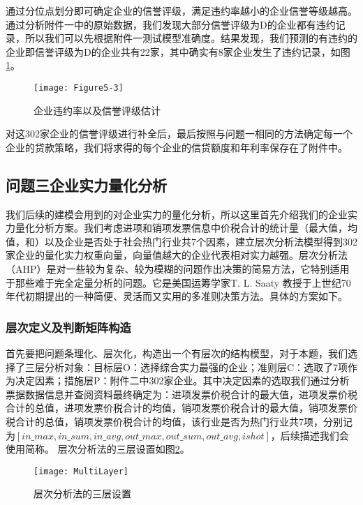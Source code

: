 \documentclass{cumcmthesis}
\begin{document}
通过分位点划分即可确定企业的信誉评级，满足违约率越小的企业信誉等级越高。通过分析附件一中的原始数据，我们发现大部分信誉评级为D的企业都有违约记录，所以我们可以先根据附件一测试模型准确度。结果发现，我们预测的有违约的企业即信誉评级为D的企业共有22家，其中确实有8家企业发生了违约记录，如图\ref{figpingji}。

\begin{figure}[H]
    \centering
    \texttt{[image: Figure5-3]}
    \caption{企业违约率以及信誉评级估计}
    \label{figpingji}
\end{figure}

对这302家企业的信誉评级进行补全后，最后按照与问题一相同的方法确定每一个企业的贷款策略，我们将求得的每个企业的信贷额度和年利率保存在了附件中。

\subsection{问题三企业实力量化分析}
我们后续的建模会用到的对企业实力的量化分析，所以这里首先介绍我们的企业实力量化分析方案。我们考虑进项和销项发票信息中价税合计的统计量（最大值，均值，和）以及企业是否处于社会热门行业共7个因素，建立层次分析法模型得到302家企业的量化实力权重向量，向量值越大的企业代表相对实力越强。层次分析法（AHP）是对一些较为复杂、较为模糊的问题作出决策的简易方法，它特别适用于那些难于完全定量分析的问题。它是美国运筹学家T. L. Saaty 教授于上世纪70 年代初期提出的一种简便、灵活而又实用的多准则决策方法。具体的方案如下。



\subsubsection{层次定义及判断矩阵构造}
首先要把问题条理化、层次化，构造出一个有层次的结构模型，对于本题，我们选择了三层分析对象：目标层O：选择综合实力最强的企业；准则层C：选取了7项作为决定因素；措施层P：附件二中302家企业。其中决定因素的选取我们通过分析票据数据信息并查阅资料最终确定为：进项发票价税合计的最大值，进项发票价税合计的总值，进项发票价税合计的均值，销项发票价税合计的最大值，销项发票价税合计的总值，销项发票价税合计的均值，该行业是否为热门行业共7项，分别记为$\left[ in\_max,in\_sum,in\_avg,out\_max,out\_sum,out\_avg,ishot \right] $，后续描述我们会使用简称。
层次分析法的三层设置如图\ref{MultiLayer}。
\begin{figure}[H]
    \centering
    \texttt{[image: MultiLayer]}
    \caption{层次分析法的三层设置}
    \label{MultiLayer}
\end{figure}
\end{document}
